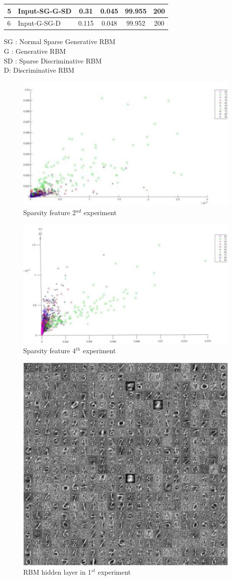 \documentclass[conference]{IEEEtran}
\begin{document}
\begin{table}[h]
\begin{tabular}{|l|l|c|c|c|c|}
		5                                                                                & Input-SG-G-SD                               & 0.31                                                                 & 0.045                                                               & 99.955                                                           & 200            \\ \hline
		6                                                                                & Input-G-SG-D                                & 0.115                                                                & 0.048                                                               & 99.952                                                           & 200            \\ \hline
	\end{tabular}
\end{table}

SG  : Normal Sparse Generative RBM
\\G : Generative RBM
\\SD : Sparse Discriminative RBM
\\D: Discriminative RBM
\begin{figure}[h]
	\centering
	\includegraphics[width=.25\textwidth]{pics/fig2.jpg}
	\caption{Sparsity feature 2$^{nd}$ experiment}
	\label{fig2}
\end{figure}

\begin{figure}[h]
	\centering
	\includegraphics[width=.25\textwidth]{pics/fig3.jpg}
	\caption{Sparsity feature 4$^{th}$ experiment}
	\label{fig3}
\end{figure}

\begin{figure}[h]
	\centering
	\includegraphics[width=.25\textwidth]{pics/fig4.jpg}
	\caption{RBM hidden layer in 1$^{st}$ experiment}
	\label{fig4}
\end{figure}
\end{document}

